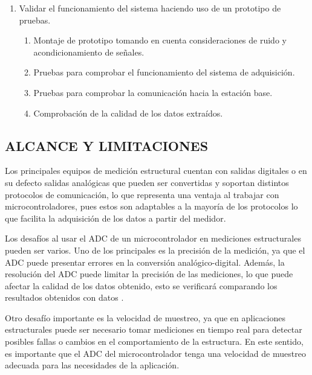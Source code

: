 \documentclass[12pt,letterpaper]{article}
\begin{document}
\begin{enumerate}[1.]
\begin{enumerate}
	      \end{enumerate}

	\item Validar el funcionamiento del sistema haciendo uso de un prototipo de pruebas.


	      \begin{enumerate}

			  \item Montaje de prototipo tomando en cuenta consideraciones de ruido y acondicionamiento de señales.
		      \item Pruebas para comprobar el funcionamiento del sistema de adquisición.
		      \item Pruebas para comprobar la comunicación hacia la estación base.
		      \item Comprobación de la calidad de los datos extraídos.

	      \end{enumerate}





\end{enumerate}




\newpage


\begin{center}

	\section*{ ALCANCE Y LIMITACIONES}
\end{center}

Los principales equipos de medición estructural cuentan con salidas digitales o en su defecto salidas analógicas que pueden ser convertidas y soportan distintos protocolos de comunicación, lo que representa una ventaja al trabajar con microcontroladores, pues estos son adaptables a la mayoría de los protocolos lo que facilita la adquisición de los datos a partir del medidor.

Los desafíos al usar el ADC de un microcontrolador en mediciones estructurales pueden ser varios. Uno de los principales es la precisión de la medición, ya que el ADC puede presentar errores en la conversión analógico-digital. Además, la resolución del ADC puede limitar la precisión de las mediciones, lo que puede afectar la calidad de los datos obtenido, esto se verificará comparando los resultados obtenidos con datos .

Otro desafío importante es la velocidad de muestreo, ya que en aplicaciones estructurales puede ser necesario tomar mediciones en tiempo real para detectar posibles fallas o cambios en el comportamiento de la estructura. En este sentido, es importante que el ADC del microcontrolador tenga una velocidad de muestreo adecuada para las necesidades de la aplicación.
\end{document}
